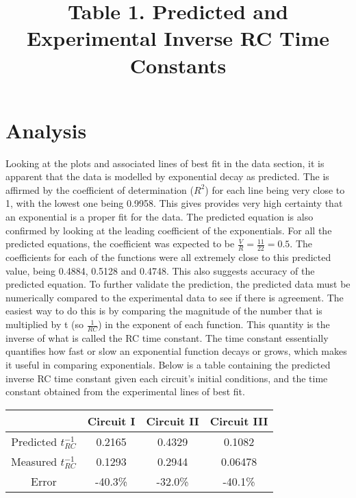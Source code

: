 \documentclass[12pt,letterpaper]{article}
\begin{document}
\section*{Analysis}
Looking at the plots and associated lines of best fit in the data section, it is apparent that the data is modelled by exponential decay as predicted. The is affirmed by the coefficient of determination ($R^2$) for each line being very close to 1, with the lowest one being 0.9958. This gives provides very high certainty that an exponential is a proper fit for the data. The predicted equation is also confirmed by looking at the leading coefficient of the exponentials. For all the predicted equations, the coefficient was expected to be $\frac{V}{R}=\frac{11}{22}=0.5$. The coefficients for each of the functions were all extremely close to this predicted value, being 0.4884, 0.5128 and 0.4748. This also suggests accuracy of the predicted equation. To further validate the prediction, the predicted data must be numerically compared to the experimental data to see if there is agreement. The easiest way to do this is by comparing the magnitude of the number that is multiplied by t (so $\frac{1}{RC}$) in the exponent of each function. This quantity is the inverse of what is called the RC time constant. The time constant essentially quantifies how fast or slow an exponential function decays or grows, which makes it useful in comparing exponentials. Below is a table containing the predicted inverse RC time constant given each circuit's initial conditions, and the time constant obtained from the experimental lines of best fit.\\\par\noindent
\title{\textbf{Table 1.} Predicted and Experimental Inverse RC Time Constants}
\begin{center}
\renewcommand*{\arraystretch}{1.5}
\begin{tabular}{|c|c|c|c|}
\hline 
 & Circuit I & Circuit II & Circuit III \\ 
\hline 
Predicted $t_{RC}^{-1}$& 0.2165 & 0.4329 & 0.1082 \\ 
\hline 
Measured $t_{RC}^{-1}$ & 0.1293 & 0.2944 & 0.06478 \\ 
\hline 
Error & -40.3\% & -32.0\% & -40.1\% \\ 
\hline 
\end{tabular} 
\end{center}
\end{document}
